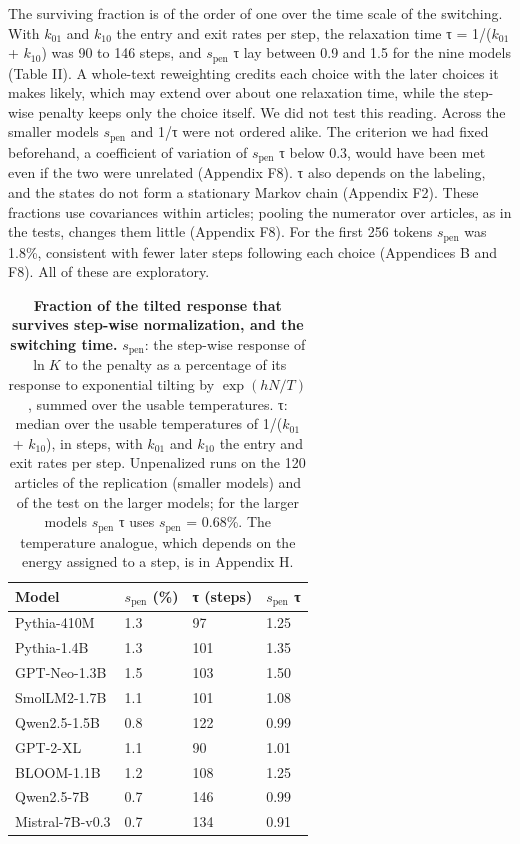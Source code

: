 \documentclass[aps,prx,onecolumn,superscriptaddress,longbibliography]{revtex4-2}
\begin{document}
The surviving fraction is of the order of one over the time scale of the switching. With \(k_{01}\) and \(k_{10}\) the entry and exit rates per step, the relaxation time τ = 1/(\(k_{01}\) + \(k_{10}\)) was 90 to 146 steps, and \(s_{\mathrm{pen}}\) τ lay between 0.9 and 1.5 for the nine models (Table II). A whole-text reweighting credits each choice with the later choices it makes likely, which may extend over about one relaxation time, while the step-wise penalty keeps only the choice itself. We did not test this reading. Across the smaller models \(s_{\mathrm{pen}}\) and 1/τ were not ordered alike. The criterion we had fixed beforehand, a coefficient of variation of \(s_{\mathrm{pen}}\) τ below 0.3, would have been met even if the two were unrelated (Appendix F8). τ also depends on the labeling, and the states do not form a stationary Markov chain (Appendix F2). These fractions use covariances within articles; pooling the numerator over articles, as in the tests, changes them little (Appendix F8). For the first 256 tokens \(s_{\mathrm{pen}}\) was 1.8\%, consistent with fewer later steps following each choice (Appendices B and F8). All of these are exploratory.

\begin{table}[htbp]
\centering
\small
\setlength{\tabcolsep}{6pt}
\caption{\textbf{Fraction of the tilted response that survives step-wise normalization, and the switching time.} \(s_{\mathrm{pen}}\): the step-wise response of \(\ln K\) to the penalty as a percentage of its response to exponential tilting by \(\exp(hN/T)\), summed over the usable temperatures. τ: median over the usable temperatures of 1/(\(k_{01}\) + \(k_{10}\)), in steps, with \(k_{01}\) and \(k_{10}\) the entry and exit rates per step. Unpenalized runs on the 120 articles of the replication (smaller models) and of the test on the larger models; for the larger models \(s_{\mathrm{pen}}\) τ uses \(s_{\mathrm{pen}}\) = 0.68\%. The temperature analogue, which depends on the energy assigned to a step, is in Appendix H.}
\label{tabII}
\begin{tabular}{@{}llll@{}}
\toprule
Model & \(s_{\mathrm{pen}}\) (\%) & τ (steps) & \(s_{\mathrm{pen}}\) τ \\
\midrule
Pythia-410M & 1.3 & 97 & 1.25 \\
Pythia-1.4B & 1.3 & 101 & 1.35 \\
GPT-Neo-1.3B & 1.5 & 103 & 1.50 \\
SmolLM2-1.7B & 1.1 & 101 & 1.08 \\
Qwen2.5-1.5B & 0.8 & 122 & 0.99 \\
GPT-2-XL & 1.1 & 90 & 1.01 \\
BLOOM-1.1B & 1.2 & 108 & 1.25 \\
Qwen2.5-7B & 0.7 & 146 & 0.99 \\
Mistral-7B-v0.3 & 0.7 & 134 & 0.91 \\
\bottomrule
\end{tabular}
\end{table}
\end{document}
